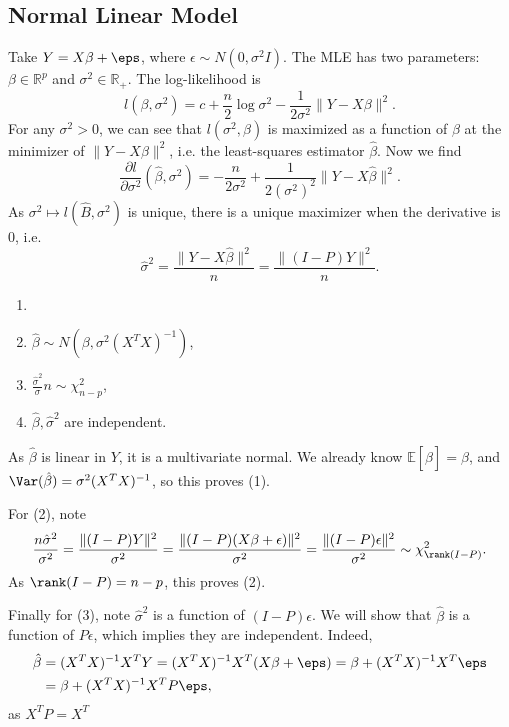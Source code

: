 \documentclass[12pt]{article}
\begin{document}
\subsection{Normal Linear Model}
\label{sub:normal_linear_model}

Take $Y = X \beta + \eps$, where $\epsilon \sim N(0, \sigma^2 I)$. The MLE has two parameters: $\beta \in \mathbb{R}^{p}$ and $\sigma^2 \in \mathbb{R}_{+}$. The log-likelihood is
\[
l(\beta, \sigma^2) = c + \frac{n}{2} \log \sigma^2 - \frac{1}{2 \sigma^2} \|Y - X \beta\|^2.
\]
For any $\sigma^2 > 0$, we can see that $l(\sigma^2, \beta)$ is maximized as a function of $\beta$ at the minimizer of $\|Y - X \beta\|^2$, i.e. the least-squares estimator $\hat \beta$. Now we find
\[
\frac{\partial l}{\partial \sigma^2}(\hat \beta, \sigma^2) = - \frac{n}{2 \sigma^2} + \frac{1}{2(\sigma^2)^2} \|Y - X \hat \beta\|^2.
\]
As $\sigma^2 \mapsto l(\hat B, \sigma^2)$ is unique, there is a unique maximizer when the derivative is $0$, i.e.
\[
\hat \sigma^2 = \frac{\|Y - X \hat \beta\|^2}{n} = \frac{\|(I-P)Y\|^2}{n}.
\]
\begin{theorem}
	\begin{enumerate}[\normalfont1.]
		\item[]
	\item $\hat \beta \sim N(\beta, \sigma^2(X^{T}X)^{-1})$,
	\item $\frac{\hat \sigma^2}{\sigma} n \sim \chi^2_{n-p}$,
	\item $\hat \beta, \hat \sigma^2$ are independent.
\end{enumerate}
\end{theorem}

\begin{proofbox}
	As $\hat \beta$ is linear in $Y$, it is a multivariate normal. We already know $\mathbb{E}[\hat \beta] = \beta$, and $\Var(\hat \beta) = \sigma^2(X^{T}X)^{-1}$, so this proves (1).

	For (2), note
	\[
	\frac{n \hat \sigma^2}{\sigma^2} = \frac{\|(I-P)Y\|^2}{\sigma^2}= \frac{\|(I-P)(X\beta+\epsilon)\|^2}{\sigma^2} = \frac{\|(I-P)\epsilon\|^2}{\sigma^2} \sim \chi^2_{\rank(I-P)}.
	\]
	As $\rank(I-P) = n - p$, this proves (2).

	Finally for (3), note $\hat \sigma^2$ is a function of $(I-P)\epsilon$. We will show that $\hat \beta$ is a function of $P \epsilon$, which implies they are independent. Indeed,
	\begin{align*}
		\hat \beta &= (X^{T}X)^{-1}X^{T}Y = (X^{T}X)^{-1}X^{T}(X\beta + \eps) = \beta + (X^{T}X)^{-1}X^{T}\eps \\
			   &= \beta + (X^{T}X)^{-1}X^{T}P\eps,
	\end{align*}
	as $X^{T}P = X^{T}$
\end{proofbox}
\end{document}
